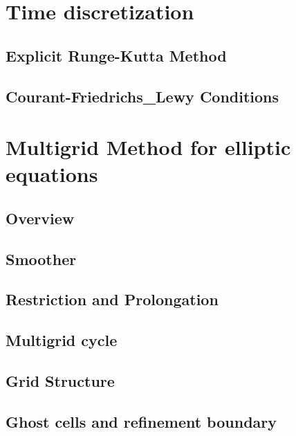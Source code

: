 \section{Time discretization}
\subsection{Explicit Runge-Kutta Method}
\subsection{Courant-Friedrichs_Lewy Conditions}

\section{Multigrid Method for elliptic equations} %
\label{section3.1}

\subsection{Overview} %
\label{section3.1.1}

\subsection{Smoother} %
\label{section3.1.2}

\subsection{Restriction and Prolongation} %
\label{section3.1.3}

\subsection{Multigrid cycle} %
\label{section3.1.4}

\subsection{Grid Structure} %
\label{section3.1.5}

\subsection{Ghost cells and refinement boundary} %
